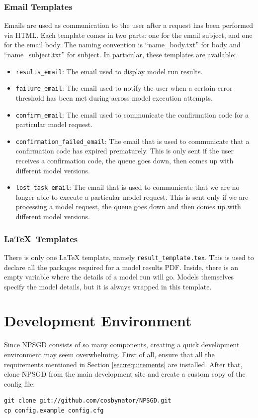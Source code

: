 \documentclass{article}
\newcommand{\mpath}[1]{\texttt{#1}}
\begin{document}
\subsubsection{Email Templates}
Emails are used as communication to the user after a request has been performed
via HTML. Each template comes in two parts: one for the email subject, and one
for the email body. The naming convention is ``name\_body.txt'' for body and
``name\_subject.txt'' for subject. In particular, these templates are available:
\begin{itemize}
    \item \texttt{results\_email}: The email used to display model run results.
    \item \texttt{failure\_email}: The email used to notify the user when a
    certain error threshold has been met during across model execution attempts.
    \item \texttt{confirm\_email}: The email used to communicate the
    confirmation code for a particular model request.
    \item \texttt{confirmation\_failed\_email}: The email that is used to
    communicate that a confirmation code has expired prematurely. This is only
    sent if the user receives a confirmation code, the queue goes down, then
    comes up with different model versions.
    \item \texttt{lost\_task\_email}: The email that is used to communicate that
    we are no longer able to execute a particular model request. This is sent
    only if we are processing a model request, the queue goes down and then
    comes up with different model versions.
\end{itemize}

\subsubsection{\LaTeX\ Templates}
There is only one LaTeX template, namely \mpath{result\_template.tex}. This is
used to declare all the packages required for a model results PDF. Inside, there
is an empty variable where the details of a model run will go. Models themselves
specify the model details, but it is always wrapped in this template.


\section{Development Environment}
Since NPSGD consists of so many components, creating a quick development
environment may seem overwhelming. First of all, ensure that all the 
requirements mentioned in Section \ref{sec:requirements} are installed. 
After that, clone NPSGD from the
main development site and create a custom copy of the config file:
\begin{verbatim}
git clone git://github.com/cosbynator/NPSGD.git
cp config.example config.cfg
\end{verbatim}
\end{document}
